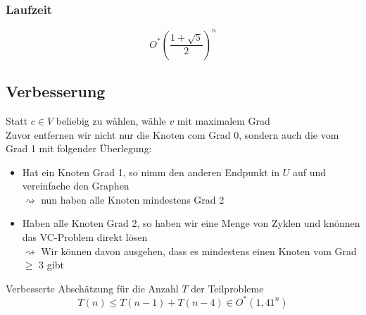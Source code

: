 \subsubsection{Laufzeit}
\[ O^*\left( \frac{1+\sqrt{5}}{2} \right)^n \]
\subsection{Verbesserung}
Statt $c\in V$ beliebig zu wählen, wähle $v$ mit maximalem Grad\\
Zuvor entfernen wir nicht nur die Knoten com Grad 0, sondern auch die vom Grad 1 mit folgender Überlegung:
\begin{figure}[H]
\end{figure}
\begin{itemize}
	\item Hat ein Knoten Grad 1, so nimm den anderen Endpunkt in $U$ auf und vereinfache den Graphen\\
	$\rightsquigarrow$ nun haben alle Knoten mindestens Grad 2
	\item Haben alle Knoten Grad 2, so haben wir eine Menge von Zyklen und knönnen das VC-Problem direkt lösen\\
	$\rightsquigarrow$ Wir können davon ausgehen, dass es mindestens einen Knoten vom Grad $\geq$ 3 gibt
\end{itemize}
\begin{figure}[H]
\end{figure}
Verbesserte Abschätzung für die Anzahl $T$ der Teilprobleme
\[ T(n) \leq T(n-1) + T(n-4) \in O^*(1,41^n)  \]
